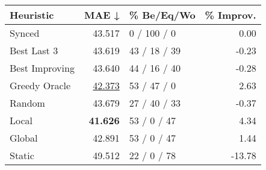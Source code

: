 \begin{tabular}{lrlr}
\toprule
\textbf{Heuristic} & \textbf{MAE ↓} & \textbf{\% Be/Eq/Wo} & \textbf{\% Improv.} \\
\midrule
            Synced &         43.517 &          0 / 100 / 0 &                0.00 \\
\midrule
       Best Last 3 &         43.619 &         43 / 18 / 39 &               -0.23 \\
    Best Improving &         43.640 &         44 / 16 / 40 &               -0.28 \\
\addlinespace
     Greedy Oracle &         \underline{42.373} &          53 / 47 / 0 &                2.63 \\
            Random &         43.679 &         27 / 40 / 33 &               -0.37 \\
\midrule
             Local &         \textbf{41.626} &          53 / 0 / 47 &                4.34 \\
            Global &         42.891 &          53 / 0 / 47 &                1.44 \\
\midrule
            Static &         49.512 &          22 / 0 / 78 &              -13.78 \\
\bottomrule
\end{tabular}

\label{tab:non_lr05_le2_bs4_Summary}
